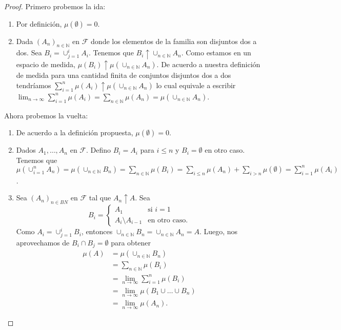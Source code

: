 \documentclass{article}
\theoremstyle{definition}
\theoremstyle{remark}
\newcommand{\BN}{\mathbb N}
\begin{document}
\begin{proof}
  Primero probemos la ida:
  \begin{enumerate}
    \item Por definici\'on, $\mu(\emptyset) = 0$.
    \item Dada $(A_n)_{n \in \BN}$ en $\mathcal{F}$ donde los elementos de la familia son disjuntos dos a dos.
      Sea $B_i = \cup_{j = 1}^i A_i$.
      Tenemos que $B_i \uparrow \cup_{n \in \BN} A_n$.
      Como estamos en un espacio de medida, $\mu(B_i) \uparrow \mu(\cup_{n \in \BN} A_n)$.
      De acuerdo a nuestra definici\'on de medida para una cantidad finita de conjuntos disjuntos dos a dos tendr\'iamos
      $\sum_{i = 1}^n \mu(A_i) \uparrow \mu(\cup_{n \in \BN} A_n)$ lo cual equivale a escribir $\lim_{n \to \infty} \sum_{i = 1}^n \mu(A_i) = \sum_{n \in \BN} \mu(A_n) = \mu(\cup_{n \in \BN} A_n)$.
  \end{enumerate}
  Ahora probemos la vuelta:
  \begin{enumerate}
    \item De acuerdo a la definici\'on propuesta, $\mu(\emptyset) = 0$.
    \item Dados $A_1, \dots, A_n$ en $\mathcal{F}$. Defino $B_i = A_i$ para $i \leq n$ y $B_i = \emptyset$ en otro caso.
      Tenemos que $\mu(\cup_{i = 1}^n A_n) = \mu(\cup_{n \in \BN} B_n) = \sum_{n \in \BN} \mu(B_i) = \sum_{i \leq n} \mu(A_n) + \sum_{i > n} \mu(\emptyset) = \sum_{i = 1}^n \mu(A_i)$.
    \item Sea $(A_n)_{n \in BN}$ en $\mathcal{F}$ tal que $A_n \uparrow A$.
      Sea
      \[
        B_i =
        \begin{cases}
          A_1 & \text{si $i = 1$}\\
          A_i \setminus A_{i - 1} & \text{en otro caso.}
        \end{cases}
      \]
      Como $A_i = \cup_{j = 1}^i B_i$, entonces $\cup_{n \in \BN} B_n = \cup_{n \in \BN} A_n = A$.
      Luego, nos aprovechamos de $B_i \cap B_j = \emptyset$ para obtener
      \begin{align*}
        \mu(A) &= \mu(\cup_{n \in \BN} B_n)\\
        &= \sum_{n \in \BN} \mu(B_i)\\
        &= \lim_{n \to \infty} \sum_{i = 1}^n \mu(B_i)\\
        &= \lim_{n \to \infty} \mu(B_1 \cup \dots \cup B_n)\\
        &= \lim_{n \to \infty} \mu(A_n).
      \end{align*}
  \end{enumerate}
\end{proof}
\end{document}
